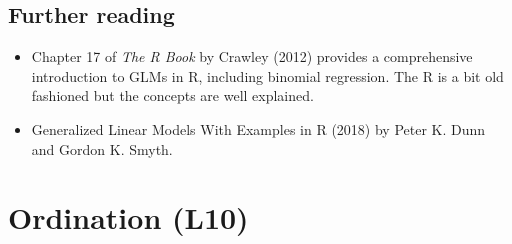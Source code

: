 \documentclass[
  letterpaper,
  8pt,
  a4paper]{book}
\providecommand{\tightlist}{%
  \setlength{\itemsep}{0pt}\setlength{\parskip}{0pt}}
\begin{document}
\section*{Further reading}\label{further-reading-7}


\begin{itemize}
\tightlist
\item
  Chapter 17 of \emph{The R Book} by Crawley (2012) provides a
  comprehensive introduction to GLMs in R, including binomial
  regression. The R is a bit old fashioned but the concepts are well
  explained.
\item
  Generalized Linear Models With Examples in R (2018) by Peter K. Dunn
  and Gordon K. Smyth.
\end{itemize}


\chapter*{Ordination (L10)}\label{ordination-l10}

\end{document}
